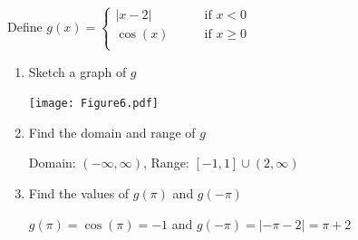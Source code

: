 \documentclass[nooutcomes, noinstructornotes]{ximera}
\begin{document}
\begin{problem}
Define 
	$g(x) =   \left\{ \begin{array}{cl}
	|x-2|		 	&	\qquad \text{if } x < 0					\\
	\cos(x)			&	\qquad \text{if }  x \geq 0  	\\		\end{array} \right.  $
\begin{enumerate}	
	\item  Sketch a graph of $g$
		\begin{freeResponse} \hfil
			\begin{image}			
			\texttt{[image: Figure6.pdf]}
			\end{image}

		\end{freeResponse}

	\item  Find the domain and range of $g$
		\begin{freeResponse}	
			Domain: $(-\infty,\infty)$, Range: $[-1,1]\cup(2,\infty)$
		\end{freeResponse}		
	
	\item  Find the values of $g(\pi)$ and $g(-\pi)$
		\begin{freeResponse}	
			$g(\pi)=\cos (\pi)=-1$ and $g(-\pi)=|-\pi-2|=\pi+2$
		\end{freeResponse}
	
	\end{enumerate}

\end{problem}

\begin{instructorNotes}

\end{instructorNotes}
\end{document}
